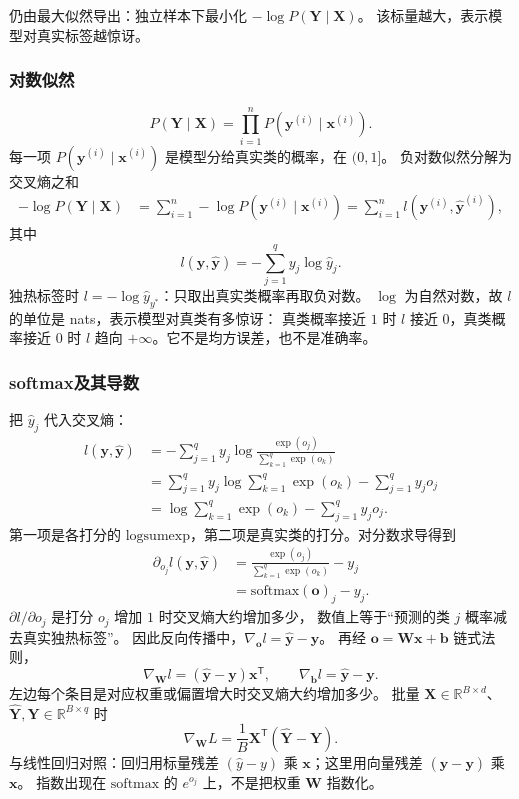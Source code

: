 仍由最大似然导出：独立样本下最小化 $-\log P(\bm{Y}\mid\bm{X})$。
该标量越大，表示模型对真实标签越惊讶。

\subsubsection{对数似然}

\[
P(\bm{Y}\mid\bm{X})=\prod_{i=1}^{n}P(\bm{y}^{(i)}\mid\bm{x}^{(i)}).
\]
每一项 $P(\bm{y}^{(i)}\mid\bm{x}^{(i)})$ 是模型分给真实类的概率，在 $(0,1]$。
负对数似然分解为交叉熵之和
\begin{align*}
-\log P(\bm{Y}\mid\bm{X})
&=
\sum_{i=1}^{n}-\log P(\bm{y}^{(i)}\mid\bm{x}^{(i)})
=
\sum_{i=1}^{n}l(\bm{y}^{(i)},\hat{\bm{y}}^{(i)}),
\end{align*}
其中
\[
l(\bm{y},\hat{\bm{y}})=-\sum_{j=1}^{q}y_{j}\log\hat{y}_{j}.
\]
独热标签时 $l=-\log\hat{y}_{y^{\ast}}$：只取出真实类概率再取负对数。
$\log$ 为自然对数，故 $l$ 的单位是 nats，表示模型对真类有多惊讶：
真类概率接近 $1$ 时 $l$ 接近 $0$，真类概率接近 $0$ 时 $l$ 趋向 $+\infty$。它不是均方误差，也不是准确率。

\subsubsection{softmax及其导数}

把 $\hat{y}_{j}$ 代入交叉熵：
\begin{align*}
l(\bm{y},\hat{\bm{y}})
&=
-\sum_{j=1}^{q}y_{j}\log\frac{\exp(o_{j})}{\sum_{k=1}^{q}\exp(o_{k})}\\
&=
\sum_{j=1}^{q}y_{j}\log\sum_{k=1}^{q}\exp(o_{k})
-\sum_{j=1}^{q}y_{j}o_{j}\\
&=
\log\sum_{k=1}^{q}\exp(o_{k})
-\sum_{j=1}^{q}y_{j}o_{j}.
\end{align*}
第一项是各打分的 $\mathrm{logsumexp}$，第二项是真实类的打分。对分数求导得到
\begin{align*}
\partial_{o_{j}}l(\bm{y},\hat{\bm{y}})
&=
\frac{\exp(o_{j})}{\sum_{k=1}^{q}\exp(o_{k})}-y_{j}\\
&=
\mathrm{softmax}(\bm{o})_{j}-y_{j}.
\end{align*}
$\partial l/\partial o_{j}$ 是打分 $o_j$ 增加 $1$ 时交叉熵大约增加多少，
数值上等于“预测的类 $j$ 概率减去真实独热标签”。
因此反向传播中，$\nabla_{\bm{o}}l=\hat{\bm{y}}-\bm{y}$。
再经 $\bm{o}=\bm{W}\bm{x}+\bm{b}$ 链式法则，
\[
\nabla_{\bm{W}}l=(\hat{\bm{y}}-\bm{y})\bm{x}^{\mathsf T},
\qquad
\nabla_{\bm{b}}l=\hat{\bm{y}}-\bm{y}.
\]
左边每个条目是对应权重或偏置增大时交叉熵大约增加多少。
批量 $\bm{X}\in\mathbb{R}^{B\times d}$、$\hat{\bm{Y}},\bm{Y}\in\mathbb{R}^{B\times q}$ 时
\[
\nabla_{\bm{W}}L=\frac{1}{B}\bm{X}^{\mathsf T}(\hat{\bm{Y}}-\bm{Y}).
\]
与线性回归对照：回归用标量残差 $(\hat{y}-y)$ 乘 $\bm{x}$；这里用向量残差 $(\hat{\bm{y}}-\bm{y})$ 乘 $\bm{x}$。
指数出现在 $\mathrm{softmax}$ 的 $e^{o_j}$ 上，不是把权重 $\bm{W}$ 指数化。

